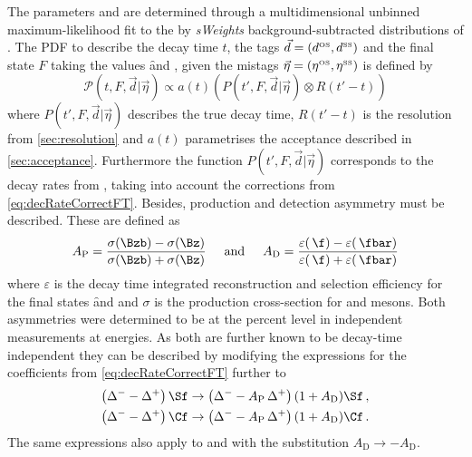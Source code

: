 The \CP parameters \Sf and \Sfbar are determined through a multidimensional unbinned maximum-likelihood fit to the by \emph{sWeights} background-subtracted distributions of \BdToDpi.
The PDF to describe the decay time $t$, the tags $\vec{d}=(d^{\text{\tiny OS}}, d^{\text{\tiny SS}})$ and the final state $F$ taking the values \f and \fbar, given the mistags $\vec{\eta}=(\eta^{\text{\tiny OS}}, \eta^{\text{\tiny SS}})$ is defined by
\begin{equation}
\mathcal{P}(t, F, \vec{d}|\vec{\eta})\propto a(t)\left(P(t', F, \vec{d}|\vec{\eta})\otimes R(t'-t)\right)\label{eq:FinalDecayTimePDF}
\end{equation}
where $P(t', F, \vec{d}|\vec{\eta})$ describes the true decay time, $R(t'-t)$ is the resolution from \cref{sec:resolution} and $a(t)$ parametrises the acceptance described in \cref{sec:acceptance}.
Furthermore the function $P(t', F, \vec{d}|\vec{\eta})$ corresponds to the decay rates from , taking into account the corrections from \cref{eq:decRateCorrectFT}.
Besides, production and detection asymmetry must be described.
These are defined as
\begin{equation}
A_{\text{P}}=\frac{\sigma(\Bzb)-\sigma(\Bz)}{\sigma(\Bzb)+\sigma(\Bz)}\hspace{0.5cm}\text{and}\hspace{0.5cm}A_{\text{D}}=\frac{\varepsilon(\,\f)-\varepsilon(\,\fbar)}{\varepsilon(\,\f)+\varepsilon(\,\fbar)}
\end{equation}
where $\varepsilon$ is the decay time integrated reconstruction and selection efficiency for the final states \f and \fbar and $\sigma$ is the production cross-section for \Bz and \Bzb mesons.
Both asymmetries were determined to be at the percent level in independent measurements at \lhc energies.
As both are further known to be decay-time independent they can be described by modifying the expressions for the \CP coefficients from \cref{eq:decRateCorrectFT} further to
\begin{equation}
\begin{aligned}
\left(\Delta^--\Delta^+\right)\Sf&\to\left(\Delta^--A_{\text{P}}\,\Delta^+\right)(1+A_{\text{D}})\Sf\,,\\
\left(\Delta^--\Delta^+\right)\Cf&\to\left(\Delta^--A_{\text{P}}\,\Delta^+\right)(1+A_{\text{D}})\Cf\,.
\end{aligned}
\end{equation}
The same expressions also apply to \Sfbar and \Cfbar with the substitution $A_{\text{D}}\to -A_{\text{D}}$.

